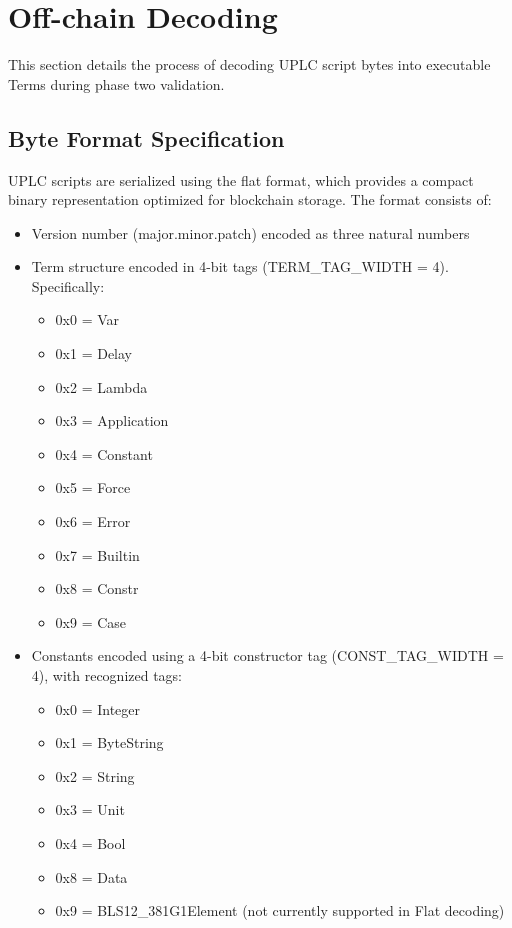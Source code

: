 \documentclass[../midgard.tex]{subfiles}
\begin{document}
\section{Off-chain Decoding}
\label{s:phase-two-decoding-off-chain}

This section details the process of decoding UPLC script bytes into executable Terms during phase two validation.

\subsection{Byte Format Specification}

UPLC scripts are serialized using the flat format, which provides a compact binary representation optimized for blockchain storage. The format consists of:

\begin{itemize}
    \item Version number (major.minor.patch) encoded as three natural numbers
    \item Term structure encoded in 4-bit tags (TERM\_TAG\_WIDTH = 4). Specifically:
    \begin{itemize}
        \item 0x0 = Var
        \item 0x1 = Delay
        \item 0x2 = Lambda
        \item 0x3 = Application
        \item 0x4 = Constant
        \item 0x5 = Force
        \item 0x6 = Error
        \item 0x7 = Builtin
        \item 0x8 = Constr
        \item 0x9 = Case
    \end{itemize}
    \item Constants encoded using a 4-bit constructor tag (CONST\_TAG\_WIDTH = 4), with recognized tags:
    \begin{itemize}
      \item 0x0 = Integer
      \item 0x1 = ByteString
      \item 0x2 = String
      \item 0x3 = Unit
      \item 0x4 = Bool
      \item 0x8 = Data
      \item 0x9 = BLS12\_381G1Element (not currently supported in Flat decoding)

\end{itemize}
\end{itemize}
\end{document}
